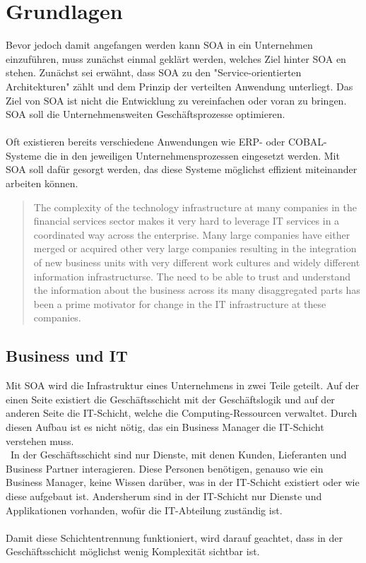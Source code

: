 \section{Grundlagen}
\label{sec:Grundlagen}
Bevor jedoch damit angefangen werden kann SOA in ein Unternehmen einzuführen, muss zunächst einmal geklärt werden, welches Ziel hinter SOA en stehen. Zunächst sei erwähnt, dass SOA zu den "Service-orientierten Architekturen" zählt und dem Prinzip der verteilten Anwendung unterliegt. Das Ziel von SOA ist nicht die Entwicklung zu vereinfachen oder voran zu bringen. SOA soll die Unternehmensweiten Geschäftsprozesse optimieren.
\\\\
Oft existieren bereits verschiedene Anwendungen wie ERP- oder COBAL-Systeme die in den jeweiligen Unternehmensprozessen eingesetzt werden. Mit SOA soll dafür gesorgt werden, das diese Systeme möglichst effizient miteinander arbeiten können.
\begin{quotation}
    \frqq The complexity of the technology infrastructure at many companies in the financial services sector makes it very hard to leverage IT services in a coordinated way across the enterprise. Many large companies have either merged or acquired other very large companies resulting in the integration of new business units with very different work cultures and widely different information infrastructurse. The need to be able to trust and understand the information about the business across its many disaggregated parts has been a prime motivator for change in the IT infrastructure at these companies.\flqq \cite[S. 17]{SOAForDummies}
\end{quotation}

\subsection{Business und IT}
\label{subsec:BusinessAndIT}
Mit SOA wird die Infrastruktur eines Unternehmens in zwei Teile geteilt. Auf der einen Seite existiert die Geschäftsschicht mit der Geschäftslogik und auf der anderen Seite die IT-Schicht, welche die Computing-Ressourcen verwaltet. Durch diesen Aufbau ist es nicht nötig, das ein Business Manager die IT-Schicht verstehen muss.
\\\
In der Geschäftsschicht sind nur Dienste, mit denen Kunden, Lieferanten und Business Partner interagieren. Diese Personen benötigen, genauso wie ein Business Manager, keine Wissen darüber, was in der IT-Schicht existiert oder wie diese aufgebaut ist. Andersherum sind in der IT-Schicht nur Dienste und Applikationen vorhanden, wofür die IT-Abteilung zuständig ist.
\\\\
Damit diese Schichtentrennung funktioniert, wird darauf geachtet, dass in der Geschäftsschicht möglichst wenig Komplexität sichtbar ist.

